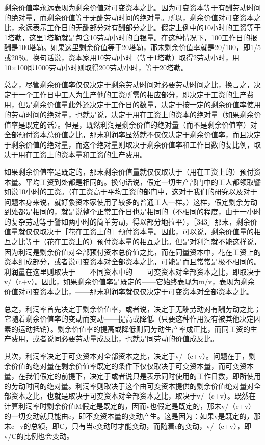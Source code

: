 剩余价值率永远表现为剩余价值对可变资本之比。因为可变资本等于有酬劳动时间的绝对量，而剩余价值等于无酬劳动时间的绝对量。所以，剩余价值对可变资本之比，永远表示工作日的无酬部分对有酬部分之比。假定上例中的10小时的工资等于1塔勒，这里1塔勒就是包含10劳动小时的白银量。在这种情况下，100工作日的报酬是100塔勒。如果这里剩余价值等于20塔勒，那末剩余价值率就是20/100，即1/5或20％。换句话说，资本家用10劳动小时（等于1塔勒）取得2劳动小时，用10×100即1000劳动小时则取得200劳动小时，等于20塔勒。

总之，尽管剩余价值率仅仅决定于剩余劳动时间对必要劳动时间之比，换言之，决定于一个工作日中工人为生产他的工资所需的相应部分，即决定于工资的生产费用，但是剩余价值量此外还决定于工作日的数量，决定于按一定的剩余价值率使用的劳动时间的绝对量，也就是说，决定于用在工资上的资本的绝对量（如果剩余价值率是既定的话）。但是，既然利润是剩余价值的绝对量（而不是剩余价值率）对全部预付资本总价值之比，那末利润率显然就不仅仅决定于剩余价值率，而且决定于剩余价值的绝对量，而这个绝对量则取决于剩余价值率和工作日数的复比例，取决于用在工资上的资本量和工资的生产费用。

如果剩余价值率是既定的，那末剩余价值量就仅仅取决于（用在工资上的）预付资本量。平均工资到处都是相同的。换句话说，假定一切生产部门中的工人都领取譬如说10小时的工资。（在工资高于平均工资的部门中，这对于我们的研究以及对于问题本身来说，就好象资本家使用了较多的普通工人一样。）这样，假定剩余劳动到处都是相同的，就是说整个正常工作日也是相同的（不相同的程度，由于一小时的复杂劳动等于譬如两小时的简单劳动，得以部分地拉平），［343］那末，剩余价值量就仅仅取决于［花在工资上的］预付资本量。因此，可以说，剩余价值量的相互之比等于（花在工资上的）预付资本量的相互之比。但是对利润就不能这样说，因为利润是剩余价值对全部预付资本总价值之比，而在同量资本中，花在工资上的资本组成部分，或者说可变资本对全部资本之比，可能是而且常常是极不相同的。利润量在这里则取决于——不同资本中的——可变资本对全部资本之比，即取决于v/（c+v）。因此，如果剩余价值率是既定的——它始终表现为m/v，表现为剩余价值对可变资本之比，——那末利润率就仅仅决定于可变资本对全部资本之比。

总之，利润率首先决定于剩余价值率，或者说，决定于无酬劳动对有酬劳动之比；它随着剩余价值率的变动而变动——提高或降低（只要这种作用没有被其他决定因素的运动抵销）。剩余价值率的提高或降低则同劳动生产率成正比，而同工资的生产费用，或者说同必要劳动量成反比，也就是同劳动的价值成反比。

其次，利润率决定于可变资本对全部资本之比，决定于v/（c+v）。问题在于，剩余价值的绝对量在剩余价值率既定的条件下仅仅取决于可变资本量，而可变资本量，在我们假定的前提下，决定于或者说只是表示同时使用的工作日数，即所使用的劳动时间的绝对量。利润率则取决于这个由可变资本提供的剩余价值绝对量对全部资本之比，也就是取决于可变资本对全部资本之比，取决于v/（c+v）。既然在计算利润率时剩余价值M假定是既定的，因而v也假定是既定的，那末v/（c+v）的一切变动就只能由c，即不变资本量的变动产生。这是因为：如果v是既定的，那末c+v的总额，即C，只有当c变动时才能变动，而随着c的变动，v/（c+v），即v/C的比例也会变动。


